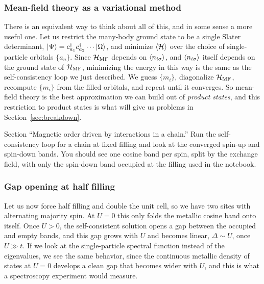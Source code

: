 \documentclass[lecture_notes.tex]{subfiles}
\begin{document}
\subsubsection{Mean-field theory as a variational method}
\label{sec:variational}
There is an equivalent way to think about all of this, and in some sense a more useful one. Let
us restrict the many-body ground state to be a single Slater determinant, $\ket{\Psi} =
c^{\dagger}_{a_1}c^{\dagger}_{a_2}\cdots\ket{\Omega}$, and minimize $\expval{\mathcal{H}}$ over the choice of single-particle
orbitals $\{a_n\}$. Since $\mathcal{H}_{\mathrm{MF}}$ depends on $\expval{n_{i\sigma}}$, and $\expval{n_{i\sigma}}$
itself depends on the ground state of $\mathcal{H}_{\mathrm{MF}}$, minimizing the energy in this way is the same as
the self-consistency loop we just described. We guess $\{m_i\}$, diagonalize $\mathcal{H}_{\mathrm{MF}}$, recompute
$\{m_i\}$ from the filled orbitals, and repeat until it converges. So mean-field theory is the
best approximation we can build out of \emph{product states}, and this restriction to product
states is what will give us problems in Section~\ref{sec:breakdown}.

\begin{notebook}
Section ``Magnetic order driven by interactions in a chain.'' Run the self-consistency loop for
a chain at fixed filling and look at the converged spin-up and spin-down bands. You should see
one cosine band per spin, split by the exchange field, with only the spin-down band occupied at
the filling used in the notebook.
\end{notebook}

\subsubsection{Gap opening at half filling}
Let us now force half filling and double the unit cell, so we have two sites with alternating
majority spin. At $U=0$ this only folds the metallic cosine band onto itself. Once $U>0$, the
self-consistent solution opens a gap between the occupied and empty bands, and this gap grows
with $U$ and becomes linear, $\Delta \sim U$, once $U \gg t$. If we look at the single-particle
spectral function instead of the eigenvalues, we see the same behavior, since the continuous
metallic density of states at $U=0$ develops a clean gap that becomes wider with $U$, and this is
what a spectroscopy experiment would measure.
\end{document}
